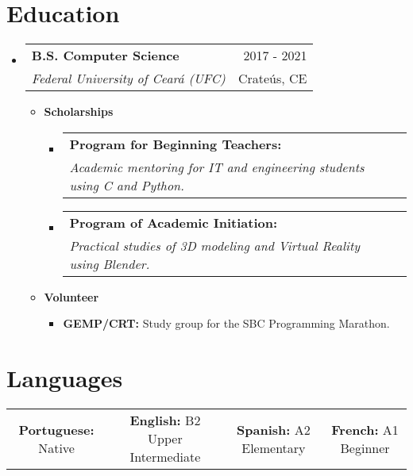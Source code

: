 \documentclass[letterpaper,11pt]{article}
\makeatletter
\newcommand{\resumeSubheading}[4]{
    \vspace{-1pt}\item
        \begin{tabular*}{0.97\textwidth}{l@{\extracolsep{\fill}}r}
            \textbf{#1} & #2 \\
            \textit{\small#3} & \small #4 \\
        \end{tabular*}
    \vspace{-5pt}
}
\newcommand{\resumeScholarship}[4]{
    \vspace{-1pt}\item
        \begin{tabular*}{0.89\textwidth}{l@{\extracolsep{\fill}}r}
            \textbf{\small#1} & #2 \\
            \textit{\small#3} & \small #4 \\
        \end{tabular*}\vspace{-5pt}
    \vspace{0.3cm}
}
\newcommand{\resumeSubHeadingListStart}{\begin{itemize}[leftmargin=*]}
\newcommand{\resumeSubHeadingListEnd}{\end{itemize}}
\makeatother
\begin{document}
\section{\faGraduationCap \hspace{0.2cm} \Large Education}

    \resumeSubHeadingListStart
        \resumeSubheading
        {B.S. Computer Science}{\faCalendar \hspace{0.1cm} 2017 - 2021}
        {Federal University of Ceará (UFC)}{\faMapMarker \hspace{0.1cm} Crateús, CE}
        \begin{itemize}
            \item \textbf{Scholarships}
                \begin{itemize}
                    \resumeScholarship
                    {Program for Beginning Teachers:}{}
                    {Academic mentoring for IT and engineering students using C and Python.}{}
            
                    \resumeScholarship
                    {Program of Academic Initiation:}{}
                    {Practical studies of 3D modeling and Virtual Reality using Blender.}{}
                \end{itemize}
        \end{itemize}
        
        \vspace{-0.2cm}
      
        \begin{itemize}
            \item \textbf{Volunteer}
                \begin{itemize}
                    \item \textbf{GEMP/CRT:} Study group for the SBC Programming Marathon. \href{https://github.com/GEMP-UFC-Crateus}{\scriptsize \faExternalLink}
                \end{itemize}
                \vspace{0.6cm}
        \end{itemize}
    \resumeSubHeadingListEnd

\section{\faComments \hspace{0.2cm} \Large Languages}

\begin{tabular}{c c c c}
    \textbf{Portuguese:} Native & \hspace{0.5cm}
    \textbf{English:} B2 Upper Intermediate & \hspace{0.5cm}
    \textbf{Spanish:} A2 Elementary & \hspace{0.5cm}
    \textbf{French:} A1 Beginner
\end{tabular}
\end{document}
